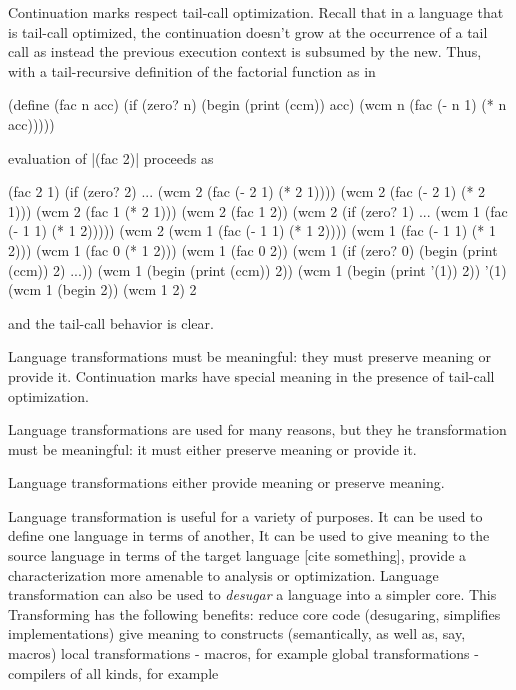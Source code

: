 \documentclass{llncs}
\begin{document}
Continuation marks respect tail-call optimization. Recall that in a language that is tail-call optimized, the continuation doesn't grow at the occurrence of a tail call as instead the previous execution context is subsumed by the new. Thus, with a tail-recursive definition of the factorial function as in
\begin{schemedisplay}
(define (fac n acc)
  (if (zero? n)
      (begin
        (print (ccm))
        acc)
      (wcm n (fac (- n 1) (* n acc)))))
\end{schemedisplay}
evaluation of \scheme|(fac 2)| proceeds as
\begin{schemedisplay}
(fac 2 1)
(if (zero? 2) ... (wcm 2 (fac (- 2 1) (* 2 1))))
(wcm 2 (fac (- 2 1) (* 2 1)))
(wcm 2 (fac 1 (* 2 1)))
(wcm 2 (fac 1 2))
(wcm 2 (if (zero? 1) ... (wcm 1 (fac (- 1 1) (* 1 2)))))
(wcm 2 (wcm 1 (fac (- 1 1) (* 1 2))))
(wcm 1 (fac (- 1 1) (* 1 2)))
(wcm 1 (fac 0 (* 1 2)))
(wcm 1 (fac 0 2))
(wcm 1 (if (zero? 0) (begin (print (ccm)) 2) ...))
(wcm 1 (begin (print (ccm)) 2))
(wcm 1 (begin (print '(1)) 2))
'(1)
(wcm 1 (begin 2))
(wcm 1 2)
2
\end{schemedisplay}
and the tail-call behavior is clear.

Language transformations must be meaningful: they must preserve meaning or provide it. Continuation marks have special meaning in the presence of tail-call optimization.

Language transformations are used for many reasons, but they he transformation must be meaningful: it must either preserve meaning or provide it.

Language transformations either provide meaning or preserve meaning.

Language transformation is useful for a variety of purposes. It can be used to define one language in terms of another, It can be used to give meaning to the source language in terms of the target language [cite something], provide a characterization more amenable to analysis or optimization. Language transformation can also be used to \emph{desugar} a language into a simpler core. This 
Transforming has the following benefits:
reduce core code (desugaring, simplifies implementations)
give meaning to constructs (semantically, as well as, say, macros)
local transformations - macros, for example
global transformations - compilers of all kinds, for example
\end{document}
